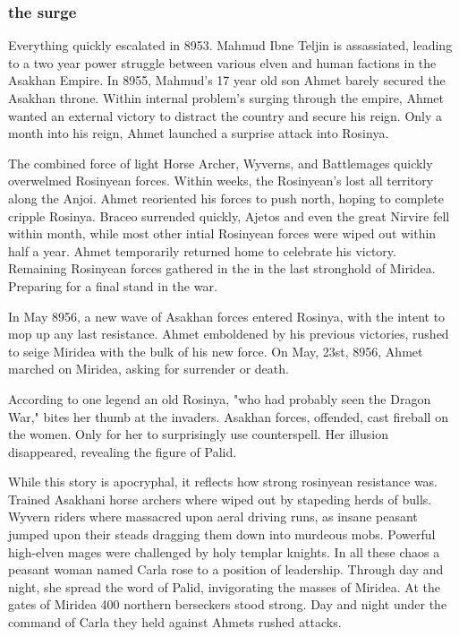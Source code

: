 \documentclass[../main.tex]{subfiles}
\begin{document}
\subsubsection{the surge}
Everything quickly escalated in 8953. Mahmud Ibne Teljin is assassiated, leading to a two year power struggle 
between various elven and human factions in the Asakhan Empire. In 8955, Mahmud's 17 year old son Ahmet
barely secured the Asakhan throne. Within internal problem's surging through the empire, Ahmet wanted an
external victory to distract the country and secure his reign. Only a month into his reign, Ahmet launched
a surprise attack into Rosinya. 

The combined force of light Horse Archer, Wyverns, and Battlemages quickly overwelmed Rosinyean forces.
Within weeks, the Rosinyean's lost all territory along the Anjoi. Ahmet reoriented his forces to push
north, hoping to complete cripple Rosinya. Braceo surrended quickly, Ajetos and even the great Nirvire
fell within month, while most other intial Rosinyean forces were wiped out within half a year. 
Ahmet temporarily returned home to celebrate his victory. Remaining Rosinyean forces gathered in the 
in the last stronghold of Miridea. Preparing for a final stand in the war.  

In May 8956, a new wave of Asakhan forces entered Rosinya, with the intent to mop up any last resistance.
Ahmet emboldened by his previous victories, rushed to seige Miridea with the bulk of his new force. On 
May, 23st, 8956, Ahmet marched on Miridea, asking for surrender or death. 

According to one legend an old Rosinya, "who had probably seen the Dragon War," bites her thumb at the invaders. 
Asakhan forces, offended, cast fireball on the women. Only for her to surprisingly use counterspell. Her
illusion disappeared, revealing the figure of Palid. 

While this story is apocryphal, it reflects how strong rosinyean resistance was. Trained Asakhani horse
archers where wiped out by stapeding herds of bulls. Wyvern riders where massacred upon aeral driving 
runs, as insane peasant jumped upon their steads dragging them down into murdeous mobs. Powerful high-elven 
mages were challenged by holy templar knights. In all these chaos a peasant woman named Carla rose to a 
position of leadership. Through day and night, she spread the word of Palid, invigorating the masses of 
Miridea. At the gates of Miridea 400 northern berseckers stood strong. Day and night under the command of 
Carla they held against Ahmets rushed attacks. 
\end{document}
